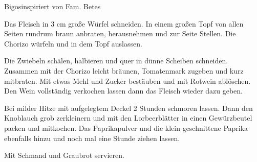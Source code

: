 \begin{recipe}{Bigos}{inspiriert von Fam. Betes}\label{Bigos}
  \inglist

\steps

Das Fleisch in 3 cm große Würfel schneiden. In einem großen Topf von allen
Seiten rundrum braun anbraten, herausnehmen und zur Seite Stellen. Die Chorizo
würfeln und in dem Topf auslassen.

Die Zwiebeln schälen, halbieren und quer in dünne Scheiben schneiden. Zusammen
mit der Chorizo leicht bräunen, Tomatenmark zugeben und kurz mitbraten.  Mit
etwas Mehl und Zucker bestäuben und mit Rotwein ablöschen. Den Wein vollständig
verkochen lassen dann das Fleisch wieder dazu geben.

Bei milder Hitze mit aufgelegtem Deckel 2 Stunden schmoren lassen. Dann den
Knoblauch grob zerkleinern und mit den Lorbeerblätter in einen Gewürzbeutel
packen und mitkochen. Das Paprikapulver und die klein geschnittene Paprika
ebenfalls hinzu und noch mal eine Stunde ziehen lassen.

Mit Schmand und Graubrot servieren.

\end{recipe}
